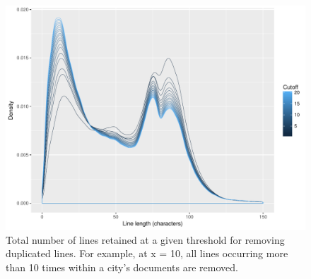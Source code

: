 \documentclass[11pt]{article}
\begin{document}








\begin{figure}[!ht]
	\centering %
	\caption{Total number of lines retained at a given threshold for removing duplicated lines. For example, at x = 10, all lines occurring more than 10 times within a city's documents are removed.}
	\label{linesCutoff}
	\includegraphics[width=\linewidth]{figures/linesCutoffIN.pdf}
\end{figure}
\end{document}
